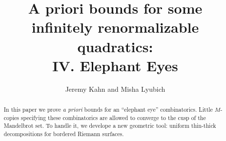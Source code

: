 \documentclass[10pt,amssymb,amsfonts,psfig]{amsart}
\begin{document}
 

\title[Elephant Eyes]{A priori bounds for some\\ infinitely renormalizable quadratics:\\
  {\tiny IV. Elephant Eyes } }

\author {Jeremy Kahn and Misha Lyubich}




\bigskip\bigskip



\date{}



\begin{abstract} 
  In this paper we prove {\it a priori} bounds for  an ``elephant eye'' combinatorics.
  Little $M$-copies specifying these
  combinatorics are allowed to converge to the cusp of the Mandelbrot set.
  To handle it, we develope a new geometric tool:
  uniform thin-thick decompositions for bordered Riemann surfaces.   
\end{abstract}

\setcounter{tocdepth}{1}
 
\maketitle
\tableofcontents






% 
% 



% 
%
%
%


% 


\end{document}
